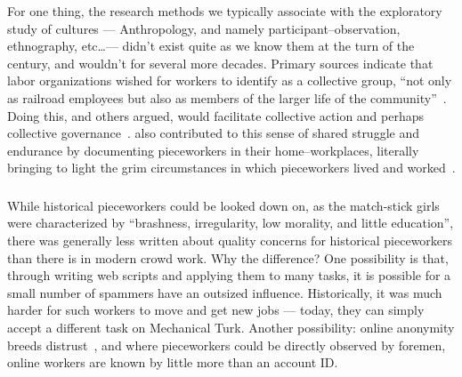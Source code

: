 \documentclass[trackingWork]{subfiles}
\begin{document}
For one thing, the research methods we typically associate with the exploratory study of cultures
--- Anthropology, and namely participant--observation, ethnography, etc\dots ---
didn't exist quite as we know them at the turn of the  century, and wouldn't for several more decades.
Primary sources indicate that labor organizations wished for workers to identify as a collective group, 
``not only as railroad employees but also as members of the larger life of the community''~\cite{american1921problem}.
Doing this, 
\citeauthor{ostrom1990governing} and others argued,
would facilitate collective action and perhaps collective governance~\cite{ostrom1990governing,russell1982collective,olsonlogic}.
\citeauthor{riisOtherSideLives} also contributed to this sense of shared struggle and endurance
by documenting pieceworkers in their home--workplaces,
literally bringing to light the grim circumstances in which pieceworkers lived and worked~\cite{riisOtherSideLives}.




\subsubsection{\whatchanged}

\begin{comment}
	*workers make little money but love autonomy --- workers make little money
	workers blamed for quality --- ???
	both cases, sociality is hard
	*collective action hard --- collective action succeeded

	- algorithms, not managers
\end{comment}

While historical pieceworkers could be looked down on, as the match-stick girls were characterized by ``brashness, irregularity, low morality, and little education'', there was generally less written about quality concerns for historical pieceworkers than there is in modern crowd work. 
Why the difference? 
One possibility is that, through writing web scripts and applying them to many tasks, it is possible for a small number of spammers have an outsized influence.
Historically, it was much harder for such workers to move and get new jobs --- today, they can simply accept a different task on Mechanical Turk.
Another possibility: online anonymity breeds distrust~\cite{friedman2000trust}, and where pieceworkers could be directly observed by foremen, online workers are known by little more than an account ID.
\end{document}
